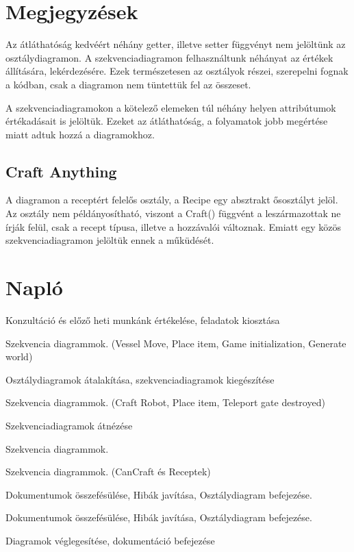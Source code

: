 \documentclass[../../projlab]{subfiles}
\begin{document}
\section{Megjegyzések}

Az átláthatóság kedvéért néhány getter, illetve setter függvényt nem jelöltünk az osztálydiagramon. A szekvenciadiagramon felhasználtunk néhányat az értékek állítására, lekérdezésére. Ezek természetesen az osztályok részei, szerepelni fognak a kódban, csak a diagramon nem tüntettük fel az összeset.

A szekvenciadiagramokon a kötelező elemeken túl néhány helyen attribútumok értékadásait is jelöltük. Ezeket az átláthatóság, a folyamatok jobb megértése miatt adtuk hozzá a diagramokhoz. 

\subsection{Craft Anything}
A diagramon a receptért felelős osztály, a Recipe egy absztrakt ősosztályt jelöl. Az osztály nem példányosítható, viszont a Craft() függvént a leszármazottak ne írják felül, csak a recept típusa, illetve a hozzávalói változnak. Emiatt egy közös szekvenciadiagramon jelöltük ennek a műküdését.


\section{Napló}

\begin{naplo}

	{ 
		Konzultáció és előző heti munkánk értékelése, feladatok kiosztása   
	}

	{ 
		Szekvencia diagrammok. (Vessel Move, Place item, Game initialization, Generate world)
	}

	{ 
		Osztálydiagramok átalakítása, szekvenciadiagramok kiegészítése
	}
	
	{ 
		Szekvencia diagrammok. (Craft Robot, Place item, Teleport gate destroyed)
	}

	{ 
		Szekvenciadiagramok átnézése   
	}

	{ 
		Szekvencia diagrammok.   
	}

	{ 
		Szekvencia diagrammok. (CanCraft és Receptek)
	}

	{ 
		Dokumentumok összefésülése, Hibák javítása, Osztálydiagram befejezése.   
	}

	{ 
		Dokumentumok összefésülése, Hibák javítása, Osztálydiagram befejezése.   
	}

	{ 
		Diagramok véglegesítése, dokumentáció befejezése   
	}

\end{naplo}
\end{document}
